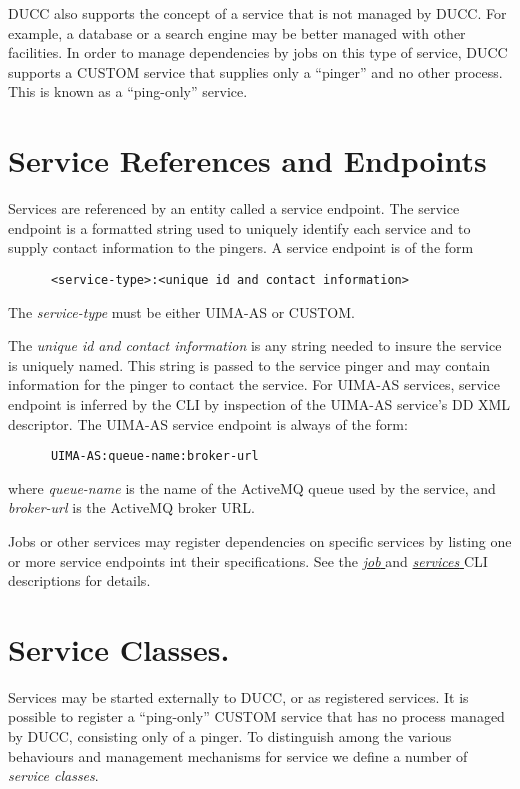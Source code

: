       DUCC also supports the concept of a service that is not managed by DUCC.  For example, a
      database or a search engine may be better managed with other facilities.  In order to manage
      dependencies by jobs on this type of service, DUCC supports a CUSTOM service that supplies
      only a ``pinger'' and no other process.  This is known as a ``ping-only'' service.

      \section{Service References and Endpoints} 
      \label{sec:service.endpoints}
      Services are referenced by an entity called a service
      endpoint. The service endpoint is a formatted string used to uniquely identify each
      service and to supply contact information to the pingers.  A service endpoint
      is of the form 
\begin{verbatim}
      <service-type>:<unique id and contact information>
\end{verbatim}
      
      The {\em service-type} must be either UIMA-AS or CUSTOM.
      
      The {\em unique id and contact information} is any string needed to insure the service is
      uniquely named.  This string is passed to the service pinger and may contain 
      information for the pinger to contact the service.  For UIMA-AS services, service endpoint is
      inferred by the CLI by inspection of the UIMA-AS service's DD XML descriptor.  The UIMA-AS
      service endpoint is always of the form:
\begin{verbatim}
      UIMA-AS:queue-name:broker-url
\end{verbatim}
      where {\em queue-name} is the name of the ActiveMQ queue used by the service, and {\em broker-url}
      is the ActiveMQ broker URL.

      Jobs or other services may register dependencies on specific services by listing one or more
      service endpoints int their specifications. See the 
      \hyperref[sec:cli.ducc-submit]{\em job } and 
      \hyperref[sec:cli.ducc-services]{\em services } CLI descriptions for details.
      
      
      \section{Service Classes.} 
      \label{sec:service.classes}
      Services may be started externally to DUCC, or as registered services.  It is
      possible to register a ``ping-only'' CUSTOM service that has no process managed by DUCC,
      consisting only of a pinger.  To distinguish among the various behaviours and management
      mechanisms for service we define a number of {\em service classes}.

